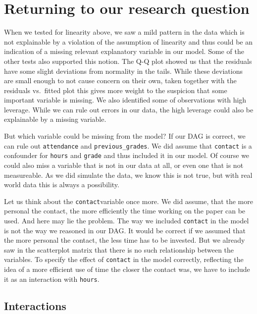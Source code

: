 \documentclass[
]{book}
\begin{document}
\hypertarget{returning-to-our-research-question-1}{%
\section{Returning to our research question}\label{returning-to-our-research-question-1}}

When we tested for linearity above, we saw a mild pattern in the data which is
not explainable by a violation of the assumption of linearity and thus could be
an indication of a missing relevant explanatory variable in our model. Some of
the other tests also supported this notion. The Q-Q plot showed us that the
residuals have some slight deviations from normality in the tails. While these
deviations are small enough to not cause concern on their own, taken together
with the residuals vs.~fitted plot this gives more weight to the suspicion that
some important variable is missing. We also identified some of observations with
high leverage. While we can rule out errors in our data, the high leverage could
also be explainable by a missing variable.

But which variable could be missing from the model?
If our DAG is correct, we can rule out \texttt{attendance} and
\texttt{previous\_grades}. We did assume that \texttt{contact} is a confounder for \texttt{hours} and
\texttt{grade} and thus included it in our model. Of course we
could also miss a variable that is not in our data at all, or even one that is
not measureable. As we did simulate the data, we know this is not true, but with
real world data this is always a possibility.

Let us think about the \texttt{contact}variable once more.
We did assume, that the more personal the contact, the more efficiently the time
working on the paper can be used. And here may lie the problem. The way we included
\texttt{contact} in the model is not the way we reasoned in our DAG. It would be
correct if we assumed that the more personal the contact, the less time has to
be invested. But we already saw in the scatterplot matrix that there is no such
relationship between the variables. To specify the effect of \texttt{contact} in the
model correctly, reflecting the idea of a more efficient use of time the closer
the contact was, we have to include it as an interaction with \texttt{hours}.

\hypertarget{interactions}{%
\subsection{Interactions}\label{interactions}}
\end{document}
